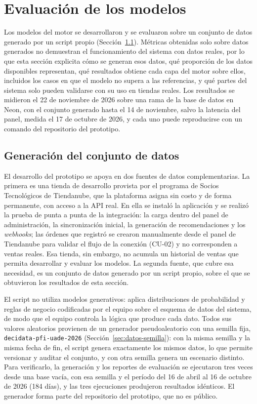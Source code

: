 \section{Evaluación de los modelos}
\label{sec:evaluacion-modelos}

Los modelos del motor se desarrollaron y se evaluaron sobre un conjunto de datos generado por un script propio (Sección~\ref{sec:eval-generacion}). Métricas obtenidas solo sobre datos generados no demuestran el funcionamiento del sistema con datos reales, por lo que esta sección explicita cómo se generan esos datos, qué proporción de los datos disponibles representan, qué resultados obtiene cada capa del motor sobre ellos, incluidos los casos en que el modelo no supera a las referencias, y qué partes del sistema solo pueden validarse con su uso en tiendas reales. Los resultados se midieron el 22 de noviembre de 2026 sobre una rama de la base de datos en Neon, con el conjunto generado hasta el 14 de noviembre, salvo la latencia del panel, medida el 17 de octubre de 2026, y cada uno puede reproducirse con un comando del repositorio del prototipo.

\subsection{Generación del conjunto de datos}
\label{sec:eval-generacion}

El desarrollo del prototipo se apoya en dos fuentes de datos complementarias. La primera es una tienda de desarrollo provista por el programa de Socios Tecnológicos de Tiendanube, que la plataforma asigna sin costo y de forma permanente, con acceso a la API real. En ella se instaló la aplicación y se realizó la prueba de punta a punta de la integración: la carga dentro del panel de administración, la sincronización inicial, la generación de recomendaciones y los \emph{webhooks}; las órdenes que registró se crearon manualmente desde el panel de Tiendanube para validar el flujo de la conexión (CU-02) y no corresponden a ventas reales. Esa tienda, sin embargo, no acumula un historial de ventas que permita desarrollar y evaluar los modelos. La segunda fuente, que cubre esa necesidad, es un conjunto de datos generado por un script propio, sobre el que se obtuvieron los resultados de esta sección.

El script no utiliza modelos generativos: aplica distribuciones de probabilidad y reglas de negocio codificadas por el equipo sobre el esquema de datos del sistema, de modo que el equipo controla la lógica que produce cada dato. Todos sus valores aleatorios provienen de un generador pseudoaleatorio con una semilla fija, \texttt{decidata-pfi-uade-2026} (Sección~\ref{sec:datos-semilla}): con la misma semilla y la misma fecha de fin, el script genera exactamente los mismos datos, lo que permite versionar y auditar el conjunto, y con otra semilla genera un escenario distinto. Para verificarlo, la generación y los reportes de evaluación se ejecutaron tres veces desde una base vacía, con esa semilla y el período del 16 de abril al 16 de octubre de 2026 (184 días), y las tres ejecuciones produjeron resultados idénticos. El generador forma parte del repositorio del prototipo, que no es público.

